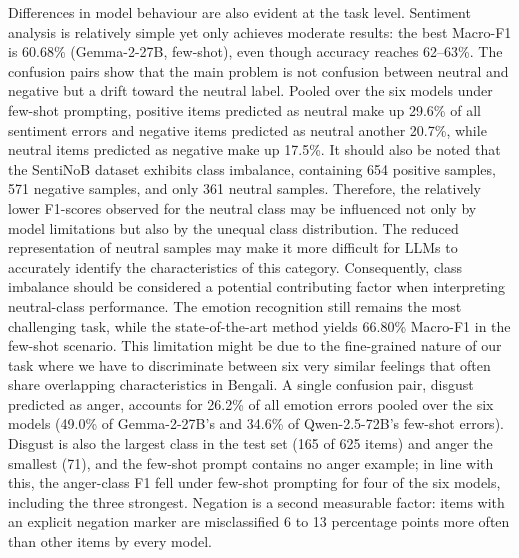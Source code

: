 \documentclass[10pt,letterpaper]{article}
\begin{document}
Differences in model behaviour are also evident at the task level. Sentiment analysis is relatively simple yet only achieves moderate results: the best Macro-F1 is 60.68\% (Gemma-2-27B, few-shot), even though accuracy reaches 62--63\%. The confusion pairs show that the main problem is not confusion between neutral and negative but a drift toward the neutral label. Pooled over the six models under few-shot prompting, positive items predicted as neutral make up 29.6\% of all sentiment errors and negative items predicted as neutral another 20.7\%, while neutral items predicted as negative make up 17.5\%. It should also be noted that the SentiNoB dataset exhibits class imbalance, containing 654 positive samples, 571 negative samples, and only 361 neutral samples. Therefore, the relatively lower F1-scores observed for the neutral class may be influenced not only by model limitations but also by the unequal class distribution. The reduced representation of neutral samples may make it more difficult for LLMs to accurately identify the characteristics of this category. Consequently, class imbalance should be considered a potential contributing factor when interpreting neutral-class performance. The emotion recognition still remains the most challenging task, while the state-of-the-art method yields 66.80\% Macro-F1 in the few-shot scenario. This limitation might be due to the fine-grained nature of our task where we have to discriminate between six very similar feelings that often share overlapping characteristics in Bengali. A single confusion pair, disgust predicted as anger, accounts for 26.2\% of all emotion errors pooled over the six models (49.0\% of Gemma-2-27B's and 34.6\% of Qwen-2.5-72B's few-shot errors). Disgust is also the largest class in the test set (165 of 625 items) and anger the smallest (71), and the few-shot prompt contains no anger example; in line with this, the anger-class F1 fell under few-shot prompting for four of the six models, including the three strongest. Negation is a second measurable factor: items with an explicit negation marker are misclassified 6 to 13 percentage points more often than other items by every model.
\end{document}
